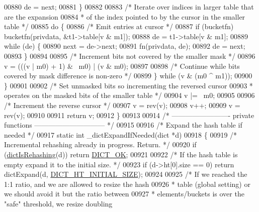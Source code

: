 \begin{DoxyCode}
00880             de = next;
00881         \}
00882 
00883         \textcolor{comment}{/* Iterate over indices in larger table that are the expansion}
00884 \textcolor{comment}{         * of the index pointed to by the cursor in the smaller table */}
00885         \textcolor{keywordflow}{do} \{
00886             \textcolor{comment}{/* Emit entries at cursor */}
00887             \textcolor{keywordflow}{if} (bucketfn) bucketfn(privdata, &t1->table[v & m1]);
00888             de = t1->table[v & m1];
00889             \textcolor{keywordflow}{while} (de) \{
00890                 next = de->next;
00891                 fn(privdata, de);
00892                 de = next;
00893             \}
00894 
00895             \textcolor{comment}{/* Increment bits not covered by the smaller mask */}
00896             v = (((v | m0) + 1) & ~m0) | (v & m0);
00897 
00898             \textcolor{comment}{/* Continue while bits covered by mask difference is non-zero */}
00899         \} \textcolor{keywordflow}{while} (v & (m0 ^ m1));
00900     \}
00901 
00902     \textcolor{comment}{/* Set unmasked bits so incrementing the reversed cursor}
00903 \textcolor{comment}{     * operates on the masked bits of the smaller table */}
00904     v |= ~m0;
00905 
00906     \textcolor{comment}{/* Increment the reverse cursor */}
00907     v = rev(v);
00908     v++;
00909     v = rev(v);
00910 
00911     \textcolor{keywordflow}{return} v;
00912 \}
00913 
00914 \textcolor{comment}{/* ------------------------- private functions ------------------------------ */}
00915 
00916 \textcolor{comment}{/* Expand the hash table if needed */}
00917 \textcolor{keyword}{static} \textcolor{keywordtype}{int} \_dictExpandIfNeeded(dict *d)
00918 \{
00919     \textcolor{comment}{/* Incremental rehashing already in progress. Return. */}
00920     \textcolor{keywordflow}{if} (\hyperlink{dict_8h_aa6e4917a6a32fdf47180e03ed8969e02}{dictIsRehashing}(d)) \textcolor{keywordflow}{return} \hyperlink{dict_8h_a2afecbeab8f7efbc183048f52f6d17e5}{DICT\_OK};
00921 
00922     \textcolor{comment}{/* If the hash table is empty expand it to the initial size. */}
00923     \textcolor{keywordflow}{if} (d->ht[0].size == 0) \textcolor{keywordflow}{return} dictExpand(d, \hyperlink{dict_8h_aff97c19d1616cf2c697573ee3f515692}{DICT\_HT\_INITIAL\_SIZE});
00924 
00925     \textcolor{comment}{/* If we reached the 1:1 ratio, and we are allowed to resize the hash}
00926 \textcolor{comment}{     * table (global setting) or we should avoid it but the ratio between}
00927 \textcolor{comment}{     * elements/buckets is over the "safe" threshold, we resize doubling}

\end{DoxyCode}
